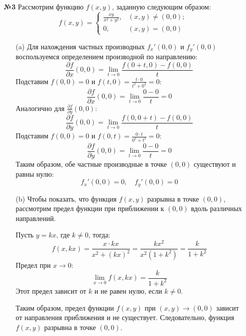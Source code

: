 \documentclass[a4paper]{article}
\begin{document}
\begin{enumerate}
    \item[\textbf{№3}]Рассмотрим функцию \( f(x, y) \), заданную следующим образом:
    \[
    f(x, y) = 
    \begin{cases}
    \frac{xy}{x^2 + y^2}, & (x, y) \neq (0, 0); \\
    0, & (x, y) = (0, 0)
    \end{cases}
    \]
    \begin{enumerate}
        \item[(a)]
        Для нахождения частных производных \( f_x'(0, 0) \) и \( f_y'(0, 0) \)
         воспользуемся определением производной по направлению:
        \[
        \frac{\partial f}{\partial x}(0, 0) = \lim_{t \to 0} 
        \frac{f(0 + t, 0) - f(0, 0)}{t}
        \]
        Подставим \( f(0, 0) = 0 \) и \( f(t, 0) = \frac{t \cdot 0}{t^2 + 0^2} = 0 \):
        \[
        \frac{\partial f}{\partial x}(0, 0) = \lim_{t \to 0} \frac{0 - 0}{t} = 0
        \]
        Аналогично для \( \frac{\partial f}{\partial y}(0, 0) \):
        \[
        \frac{\partial f}{\partial y}(0, 0) = 
        \lim_{t \to 0} \frac{f(0, 0 + t) - f(0, 0)}{t}
        \]
        Подставим \( f(0, 0) = 0 \) и \( f(0, t) = \frac{0 \cdot t}{0^2 + t^2} = 0 \):
        \[
        \frac{\partial f}{\partial y}(0, 0) = \lim_{t \to 0} \frac{0 - 0}{t} = 0
        \]
        Таким образом, обе частные производные в точке \((0, 0)\) существуют и равны нулю:
        \[
        f_x'(0, 0) = 0, \quad f_y'(0, 0) = 0
        \]
        \item[(b)]
        Чтобы показать, что функция \( f(x, y) \) разрывна в точке \((0, 0)\), 
        рассмотрим предел функции при приближении к \((0, 0)\) вдоль различных 
        направлений.

        Пусть \( y = kx \), где \( k \neq 0 \), тогда:
        \[
        f(x, kx) = \frac{x \cdot kx}{x^2 + (kx)^2} = \frac{kx^2}{x^2(1 + k^2)} = \frac{k}{1 + k^2}
        \]
        Предел при \( x \to 0 \):
        \[
        \lim_{x \to 0} f(x, kx) = \frac{k}{1 + k^2}
        \]
        Этот предел зависит от \( k \) и не равен нулю, если \( k \neq 0 \).
        
        Таким образом, предел функции \( f(x, y) \) при \((x, y) \to (0, 0)\) 
        зависит от направления приближения и не существует. Следовательно, функция
         \( f(x, y) \) разрывна в точке \((0, 0)\).\\
            
    \end{enumerate}


\end{enumerate}
\end{document}
